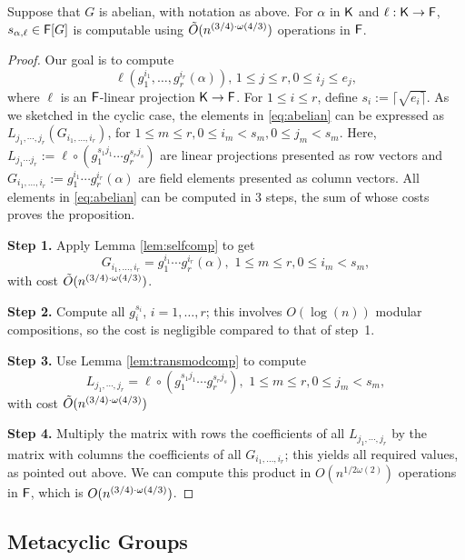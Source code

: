 \begin{proposition}
  Suppose that $G$ is abelian, with notation as above. For $\alpha$ in ${\mathsf{K}}$ and $\ell:{\mathsf{K}}\to{\mathsf{F}}$, 
  $s_{\alpha,\ell} \in {\mathsf{F}}[G]$ is computable using  $\tilde{O}(n^{(3/4)\cdot \omega(4/3)})$
  operations in ${\mathsf{F}}$.
\end{proposition}
\begin{proof}
Our goal is to compute
\begin{equation}\label{eq:abelian}
  \ell (g_1^{i_1},  \ldots, g_r^{i_r}(\alpha)), \, 1 \leq j \leq r, 0 \leq i_j \leq e_j,
\end{equation}
where $\ell$ is an ${\mathsf{F}}$-linear projection ${\mathsf{K}}\to {\mathsf{F}}$.  For $ 1\leq i
\leq r$, define $s_i:=\lceil\sqrt{e_i \rceil}$. As we sketched in the
cyclic case, the elements in \eqref{eq:abelian} can be expressed as
$L_{j_1,\cdots, j_r} (G_{i_1,\dots,i_r})$, 
for $1\leq m \leq r, 0\leq i_m < s_m, 0 \leq j_m < s_m$.
Here, $L_{j_1\cdots j_r} :=\ell \circ (g_1^{s_1j_1} \cdots
g_r^{s_rj_s})$ are linear projections presented as row vectors and
$G_{i_1,\dots,i_r}:=g_1^{i_1} \cdots g_r^{i_r}(\alpha)$ are field
elements presented as column vectors. All elements in
\eqref{eq:abelian} can be computed in 3 steps, the sum of whose 
costs proves the proposition.

\smallskip\noindent \textbf{Step 1.} Apply Lemma \ref{lem:selfcomp} to get 
$$G_{i_1,\dots,i_r}=g_1^{i_1} \cdots g_r^{i_r}(\alpha), \,\, 1\leq m \leq r, 0\leq i_m < s_m,$$
with cost $\tilde{O}(n^{(3/4)\cdot \omega(4/3)})$.

\smallskip\noindent\textbf{Step 2.} Compute all $g_i^{s_i}$, $i=1,\dots,r$;
this involves $O(\log(n))$ modular compositions, so the cost is negligible
compared to that of step~1.

\smallskip\noindent\textbf{Step 3.} Use Lemma \ref{lem:transmodcomp} to compute 
$$L_{j_1,\cdots,j_r} = \ell \circ (g_1^{s_1j_1} \cdots
g_r^{s_rj_s}), \,\, 1\leq m \leq r, 0 \leq j_m < s_m,$$
with cost $\tilde{O}(n^{(3/4)\cdot \omega(4/3)})$

\smallskip\noindent\textbf{Step 4.} Multiply the matrix with rows the
coefficients of all $L_{j_1,\cdots,j_r}$ by the matrix with columns
the coefficients of all $G_{i_1,\dots,i_r}$; this yields all required
values, as pointed out above. We can compute this  product in
$O(n^{1/2\omega(2)})$ operations in ${\mathsf{F}}$, which is $O(n^{(3/4)\cdot \omega(4/3)})$.
\end{proof}


\subsection{Metacyclic Groups}

